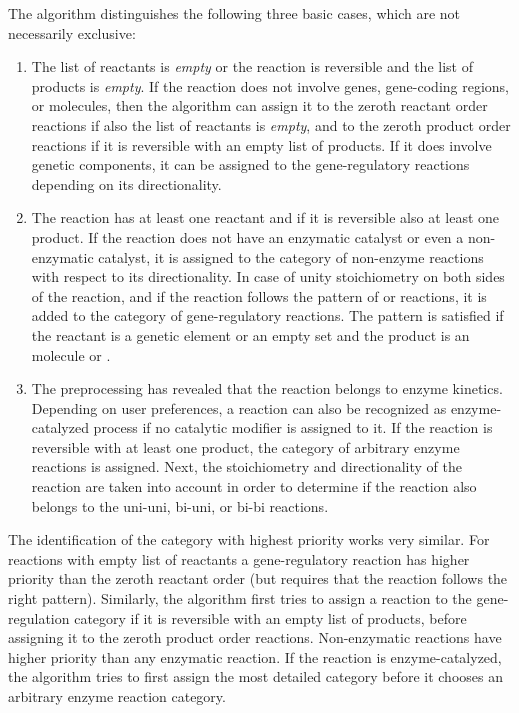 The algorithm distinguishes the following three basic cases, which are not necessarily exclusive:
\begin{enumerate}
  \item The list of reactants is \emph{empty} or the reaction is reversible and the list of products is \emph{empty}.
If the reaction does not involve genes, gene-coding regions, or \RNA molecules, then the algorithm can assign it to the  zeroth reactant order reactions if also the list of reactants is \emph{empty}, and to the zeroth product order reactions if it is reversible with an empty list of products.
If it does involve genetic components, it can be assigned to the gene-regulatory reactions depending on its directionality.

  \item The reaction has at least one reactant and if it is reversible also at least one product.
If the reaction does not have an enzymatic catalyst or even a non-enzymatic catalyst, it is assigned to the category of non-enzyme reactions with respect to its directionality.
In case of unity stoichiometry on both sides of the reaction, and if the reaction follows the pattern of \transcription or \translation reactions, it is added to the category of gene-regulatory reactions.
The pattern is satisfied if the reactant is a genetic element or an empty set and the product is an \RNA molecule or \protein.

  \item The preprocessing has revealed that the reaction belongs to enzyme kinetics.
Depending on user preferences, a reaction can also be recognized as enzyme-catalyzed process if no catalytic modifier is assigned to it.
If the reaction is reversible with at least one product, the category of arbitrary enzyme reactions is assigned.
Next, the stoichiometry and directionality of the reaction are taken into account in order to determine if the reaction also belongs to the uni-uni, bi-uni, or bi-bi reactions.
\end{enumerate}
The identification of the category with highest priority works very similar.
For reactions with empty list of reactants a gene-regulatory reaction has higher priority than the zeroth reactant order (but requires that the reaction follows the right pattern).
Similarly, the algorithm first tries to assign a reaction to the gene-regulation category if it is reversible with an empty list of products, before assigning it to the zeroth product order reactions.
Non-enzymatic reactions have higher priority than any enzymatic reaction.
If the reaction is enzyme-catalyzed, the algorithm tries to first assign the most detailed category before it chooses an arbitrary enzyme reaction category.

